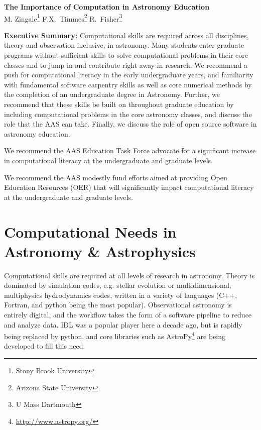 \documentclass[11pt]{article}
\begin{document}
\thispagestyle{plain}

\begin{center}
{\Large \sffamily \bfseries The Importance of Computation in Astronomy Education} \\
{
M. Zingale\footnote{Stony Brook University}
F.X.~Timmes\footnote{Arizona State University}
R.~Fisher\footnote{U Mass Dartmouth}
}
\end{center}

\begin{tcolorbox}
{\sffamily \bfseries Executive Summary:} Computational skills are required
across all disciplines, theory and observation inclusive, in astronomy.
Many students enter graduate programs without sufficient skills
to solve computational problems in their core classes and to jump in and
contribute right away in research. We recommend a push for computational
literacy in the early undergraduate years, and familiarity with fundamental
software carpentry skills as well as core numerical methods by the
completion of an undergraduate degree in Astronomy.  Further, we recommend
that these skills be built on throughout graduate education by including
computational problems in the core astronomy classes, and discuss
the role that the AAS can take.  Finally, we discuss
the role of open source software in astronomy education.

\vspace {0.1in} We recommend the AAS Education Task Force advocate for
a significant increase in computational literacy at the undergraduate
and graduate levels.

\vspace {0.1in} We recommend the AAS modestly fund efforts aimed at
providing Open Education Resources (OER) that will significantly
impact computational literacy at the undergraduate and graduate
levels.


\end{tcolorbox}

\section{Computational Needs in Astronomy \& Astrophysics}

Computational skills are required at all levels of research in
astronomy.  Theory is dominated by simulation codes, e.g. stellar
evolution or multidimensional, multiphysics hydrodynamics codes,
written in a variety of languages (C++, Fortran, and python being the
most popular).  Observational astronomy is entirely digital, and the
workflow takes the form of a software pipeline to reduce and analyze
data.  IDL was a popular player here a decade ago, but is rapidly
being replaced by python, and core libraries such as
AstroPy\footnote{\url{http://www.astropy.org/}} are being developed to
fill this need.
\end{document}
